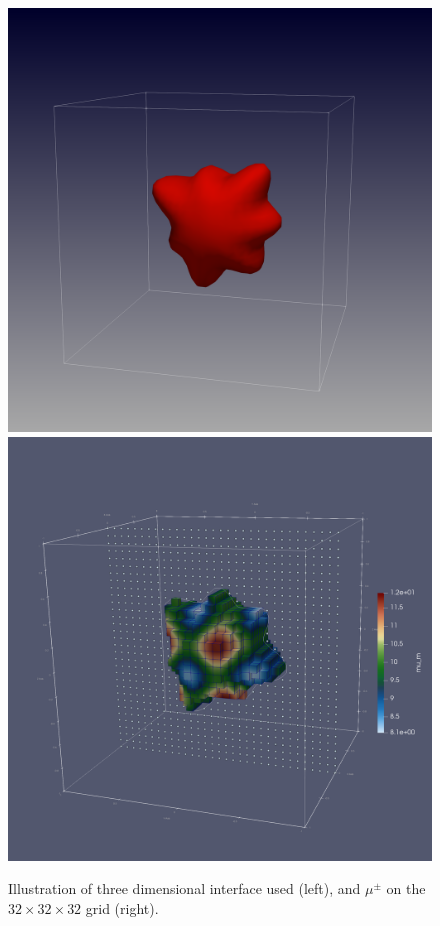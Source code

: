 \documentclass{elsarticle}
\begin{document}
\begin{figure}
	\centering
	\includegraphics[width=0.49\linewidth]{./figures/star_shape.png}
	\includegraphics[width=0.49\linewidth]{./figures/star_mu_m.png}
	\caption{Illustration of three dimensional interface used (left), and $\mu^\pm$ on the $32\times 32\times 32$ grid (right).}
	\label{fig:star}
\end{figure}
\end{document}
